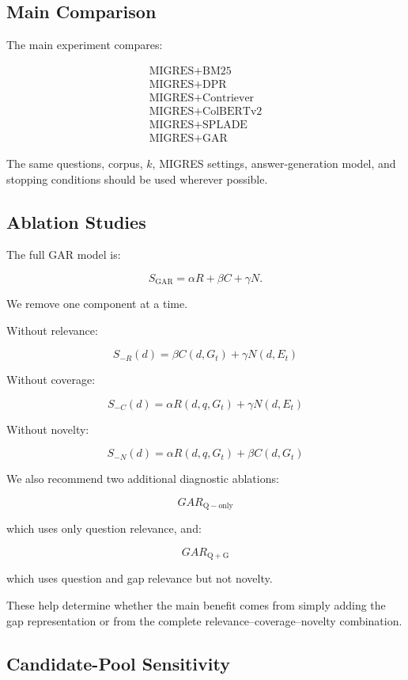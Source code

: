 \documentclass[11pt,a4paper]{article}
\begin{document}
\subsection{Main Comparison}

The main experiment compares:

\[
\boxed{
\begin{array}{c}
\text{MIGRES+BM25}\\
\text{MIGRES+DPR}\\
\text{MIGRES+Contriever}\\
\text{MIGRES+ColBERTv2}\\
\text{MIGRES+SPLADE}\\
\text{MIGRES+GAR}
\end{array}
}
\]

The same questions, corpus, $k$, MIGRES settings, answer-generation model, and stopping conditions should be used wherever possible.

\subsection{Ablation Studies}

The full GAR model is:

\[
S_{\mathrm{GAR}}
=
\alpha R+\beta C+\gamma N.
\]

We remove one component at a time.

Without relevance:

\[
\boxed{
S_{-R}(d)
=
\beta C(d,G_t)+\gamma N(d,E_t)
}
\]

Without coverage:

\[
\boxed{
S_{-C}(d)
=
\alpha R(d,q,G_t)+\gamma N(d,E_t)
}
\]

Without novelty:

\[
\boxed{
S_{-N}(d)
=
\alpha R(d,q,G_t)+\beta C(d,G_t)
}
\]

We also recommend two additional diagnostic ablations:

\[
GAR_{\mathrm{Q-only}}
\]

which uses only question relevance, and:

\[
GAR_{\mathrm{Q+G}}
\]

which uses question and gap relevance but not novelty.

These help determine whether the main benefit comes from simply adding the gap representation or from the complete relevance--coverage--novelty combination.

\subsection{Candidate-Pool Sensitivity}
\end{document}
